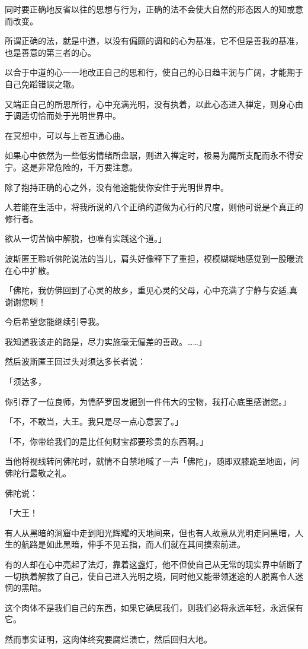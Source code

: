 \documentclass[twoside,openany]{book}
\begin{document}
同时要正确地反省以往的思想与行为，正确的法不会使大自然的形态因人的知或意而改变。

所谓正确的法，就是中道，以没有偏颇的调和的心为基准，它不但是善我的基准，也是善意的第三者的心。

以合于中道的心一一地改正自己的思和行，使自己的心日趋丰润与广阔，才能期于自己免蹈错误之辙。

又端正自己的所思所行，心中充满光明，没有执着，以此心态进入禅定，则身心由于调适切恰而处于光明世界中。

在冥想中，可以与上苍互通心曲。

如果心中依然为一些低劣情绪所盘踞，则进入禅定时，极易为魔所支配而永不得安宁。这是非常危险的，千万要注意。

除了抱持正确的心之外，没有他途能使你安住于光明世界中。

人若能在生活中，将我所说的八个正确的道做为心行的尺度，则他可说是个真正的修行者。

欲从一切苦恼中解脱，也唯有实践这个道。」

波斯匿王聆听佛陀说法的当儿，肩头好像释下了重担，模模糊糊地感觉到一股暖流在心中扩散。

「佛陀，我仿佛回到了心灵的故乡，重见心灵的父母，心中充满了宁静与安适,真谢谢您啊！

今后希望您能继续引导我。

我知道我该走的路是，尽力实施毫无偏差的善政。……」

然后波斯匿王回过头对须达多长者说：

「须达多，

你引荐了一位良师，为憍萨罗国发掘到一件伟大的宝物，我打心底里感谢您。」

「不，不敢当，大王。我只是尽一点心意罢了。」

「不，你带给我们的是比任何财宝都要珍贵的东西啊。」

当他将视线转问佛陀时，就情不自禁地喊了一声「佛陀」，随即双膝跪至地面，问佛陀行最敬之礼。

佛陀说：

「大王！

有人从黑暗的涧窟中走到阳光辉耀的天地间来，但也有人故意从光明走冋黑暗，人生的航路是如此黑暗，伸手不见五指，而人们就在其间摸索前进。

有的人却在心中亮起了法灯，靠着这盏灯，他不但使自己从无常的现实界中斩断了一切执着解救了自己，使自己进入光明之境，同时他又能带领迷途的人脱离令人迷惘的黑暗。

这个肉体不是我们自己的东西，如果它确属我们，则我们必将永远年轻，永远保有它。

然而事实证明，这肉体终究要腐烂溃亡，然后回归大地。
\end{document}
